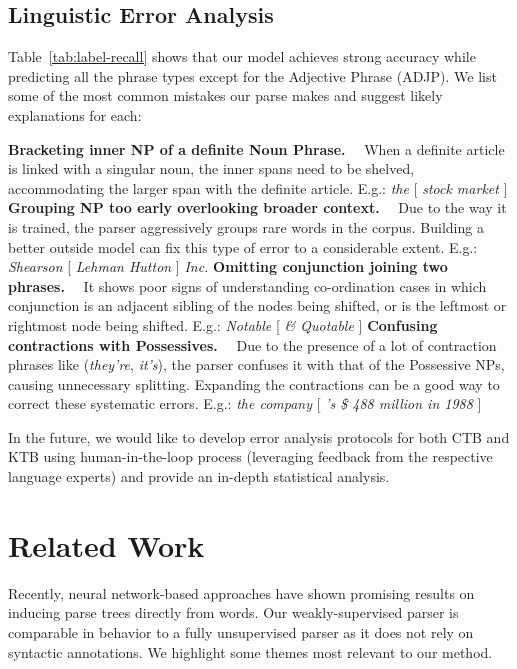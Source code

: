 \documentclass[11pt]{article}
\newcommand{\para}[1]{\vskip 1mm\noindent\textbf{#1}~~}
\begin{document}
\subsection{Linguistic Error Analysis}
\label{ssec:error-analysis}

Table~\ref{tab:label-recall} shows that our model achieves strong accuracy while predicting all the phrase types except for the Adjective Phrase (ADJP). We list some of the most common mistakes our parse makes and suggest likely explanations for each:

\para{Bracketing inner NP of a definite Noun Phrase.} When a definite article is linked with a singular noun, the inner spans need to be shelved, accommodating the larger span with the definite article. E.g.: \textit{the} [ \textit{stock market} ] 
\para{Grouping NP too early overlooking broader context.} Due to the way it is trained, the parser aggressively groups rare words in the corpus. Building a better outside model can fix this type of error to a considerable extent. E.g.: \textit{Shearson} [ \textit{Lehman Hutton} ] \textit{Inc.}
\para{Omitting conjunction joining two phrases.} It shows poor signs of understanding co-ordination cases in which conjunction is an adjacent sibling of the nodes being shifted, or is the leftmost or rightmost node being shifted. E.g.: \textit{Notable} [ \textit{\& Quotable} ]
\para{Confusing contractions with Possessives.} Due to the presence of a lot of contraction phrases like (\textit{they're}, \textit{it's}), the parser confuses it with that of the Possessive NPs, causing unnecessary splitting. Expanding the contractions can be a good way to correct these systematic errors. E.g.: \textit{the company} [ \textit{'s \$ 488 million in 1988} ]

In the future, we would like to develop error analysis protocols for both CTB and KTB using human-in-the-loop process (leveraging feedback from the respective language experts) and provide an in-depth statistical analysis.




 \section{Related Work}
\label{sec:related-work}

Recently, neural network-based approaches have shown promising results on inducing parse trees directly from words. Our weakly-supervised parser is comparable in behavior to a fully unsupervised parser as it does not rely on syntactic annotations. We highlight some themes most relevant to our method.
\end{document}
